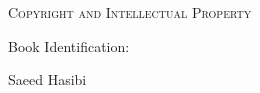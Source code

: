 %
%
%
%


\clearpage

\thispagestyle{empty}



\begin{center}

\vspace*{2.0cm}

{\Large
\textsc{Copyright and Intellectual Property}
}

\vspace{1.2cm}

{\LARGE
\bfseries
\BookTitle
}

\vspace{0.4cm}

{\normalsize
\BookNumber
}

\vspace{0.3cm}

{\normalsize
\BookSeriesTitle
}

\vspace{0.5cm}

{\small
Book Identification: \BookID
}

\vspace{0.8cm}

{\large
Saeed Hasibi
}

\end{center}


\vfill



